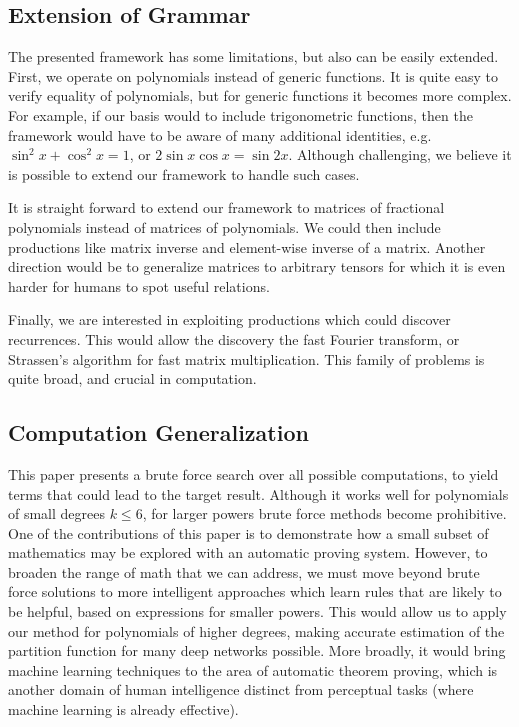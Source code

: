 \subsection{Extension of Grammar}
\label{sec:extend}
The presented framework has some limitations, but also can be easily extended. First,
we operate on polynomials instead of generic functions. 
It is quite easy to verify equality of polynomials, but for generic functions it becomes more complex.
For example, if our basis would to include trigonometric functions, then the
framework would have to be aware of many additional identities,
e.g. $\sin^2{x} + \cos^2{x} = 1$, or $2\sin x \cos x = \sin
2x$. Although challenging, we believe it is possible to extend our
framework to handle such cases. 

It is straight forward to extend our framework to matrices of fractional
polynomials instead of matrices of polynomials.  We could
then include productions like matrix inverse and element-wise inverse of
a matrix.  Another direction would be to generalize matrices to arbitrary tensors
for which it is even harder for humans to spot useful relations.

Finally, we are interested in exploiting productions which could discover 
recurrences. This would allow the discovery the fast Fourier transform, or
Strassen's algorithm for fast matrix multiplication. This family of problems is quite broad,
and crucial in computation.


\subsection{Computation Generalization}
\label{subsec:agenda}

This paper presents a brute force search over all possible computations, 
to yield terms that could lead to the target result. Although it works
well for polynomials of small degrees $k \leq 6$, for larger powers 
brute force methods become prohibitive. One of the contributions of this paper is to
demonstrate how a small subset of mathematics may be explored with an automatic proving
system. However, to broaden the range of math that we can address, we
must move beyond brute force solutions to more intelligent approaches
which learn rules that are likely to be helpful, based on expressions
for smaller powers. This would allow us to apply our method for polynomials of 
higher degrees, making accurate estimation of the partition function for many deep
networks possible. More broadly, it would bring machine learning techniques
to the area of automatic theorem proving, which is another domain of
human intelligence distinct from perceptual tasks (where machine
learning is already effective). 

